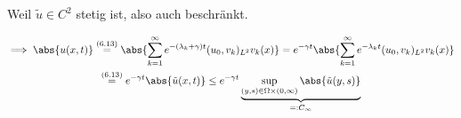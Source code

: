 \begin{solution}
\begin{enumerate}[label = (\roman*)]
  Weil $\tilde u \in C^2$ stetig ist, also auch beschränkt.

  \begin{multline*}
    \implies
    \abs{u(x, t)}
    \stackrel
    {
      \mathrm{(6.13)}
    }{=}
    \abs
    {
      \sum_{k=1}^\infty
      e^{-(\lambda_k + \gamma) t}
      (u_0, v_k)_{L^2}
      v_k(x)
    }
    =
    e^{-\gamma t}
    \abs
    {
      \sum_{k=1}^\infty
      e^{-\lambda_k t}
      (u_0, v_k)_{L^2}
      v_k(x)
    } \\
    \stackrel
    {
      \mathrm{(6.13)}
    }{=}
    e^{-\gamma t}
    \abs{\tilde u(x, t)}
    \leq
    e^{-\gamma t}
    \underbrace
    {
      \sup_{(y, s) \in \Omega \times (0, \infty)}
      \abs{\tilde u(y, s)}
    }_{
      =: C_\infty
    }
  \end{multline*}

\end{enumerate}

\end{solution}

